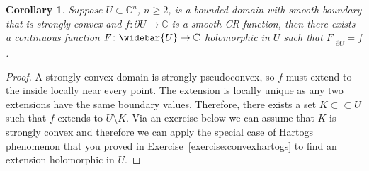 \documentclass[12pt,openany]{book}
\newcommand{\C}{{\mathbb{C}}}
\theoremstyle{plain}
\newtheorem{cor}[thm]{Corollary}
\theoremstyle{remark}
\theoremstyle{definition}
\theoremstyle{exercise}
\theoremstyle{example}
\newcommand{\exerciseref}[1]{\hyperref[#1]{Exercise~\ref*{#1}}}
\begin{document}
\begin{cor} \label{cor:bochnerhartogsstrconvex}
Suppose $U \subset \C^n$, $n \geq 2$, is a bounded domain with smooth boundary that is
strongly convex
and $f \colon \partial U \to \C$ is a smooth CR function, then
there exists a continuous function $F \colon \widebar{U} \to \C$
holomorphic in $U$
such that $F|_{\partial U} = f$.
\end{cor}

\begin{proof}
A strongly convex domain is strongly pseudoconvex, so $f$ must extend to the
inside locally near every point.  The extension is locally unique as any two
extensions have the same boundary values.  Therefore, there exists a set
$K \subset \subset U$ such that $f$ extends to $U \setminus K$.
Via an exercise below we can assume that $K$ is strongly convex and
therefore we can apply the special case of Hartogs phenomenon
that you proved in \exerciseref{exercise:convexhartogs} to find an
extension holomorphic in $U$.
\end{proof}
\end{document}
